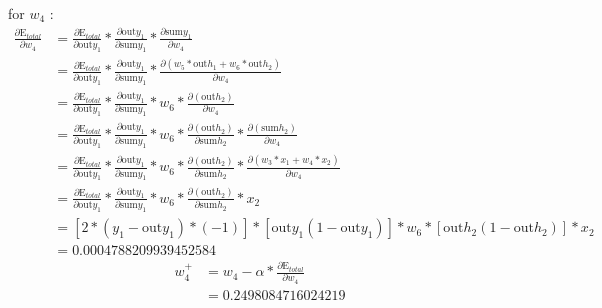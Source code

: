 \documentclass[a4paper, article, oneside, USenglish, IN5460]{memoir}
\begin{document}
{\newline
for $w_4$ :
\begin{equation}
\begin{aligned}
\frac{\partial \text{E}_{total}  }{\partial w_4} &= \frac{\partial \text{E}_{total}}{\partial \text{out}y_1} *\frac{\partial  \text{out}y_1}{\partial \text{sum}y_1}*\frac{\partial \text{sum}y_1}{\partial  w_4} \\
&= \frac{\partial \text{E}_{total}}{\partial \text{out}y_1} *\frac{\partial  \text{out}y_1}{\partial \text{sum}y_1}*\frac{\partial ( w_5*\text{out}h_1 + w_6*\text{out}h_2 )} {\partial w_4} \\
&= \frac{\partial \text{E}_{total}}{\partial \text{out}y_1} * \frac{\partial \text{out}y_1}{\partial \text{sum}y_1} *{w_6}* \frac{\partial ( \text{out}h_2 )} {\partial w_4}\\
&= \frac{\partial \text{E}_{total}}{\partial \text{out}y_1} * \frac{\partial \text{out}y_1}{\partial \text{sum}y_1} *{w_6}* \frac{\partial ( \text{out}h_2 )}{\partial \text{sum}h_2} * \frac{\partial ( \text{sum}h_2)}{\partial w_4}\\
&= \frac{\partial \text{E}_{total}}{\partial \text{out}y_1} * \frac{\partial \text{out}y_1}{\partial \text{sum}y_1} *{w_6}* \frac{\partial ( \text{out}h_2 )}{\partial \text{sum}h_2} * \frac{\partial ( w_3*x_1 + w_4*x_2)}{\partial w_4}\\
&= \frac{\partial \text{E}_{total}}{\partial \text{out}y_1} * \frac{\partial \text{out}y_1}{\partial \text{sum}y_1} *{w_6}* \frac{\partial ( \text{out}h_2 )}{\partial \text{sum}h_2} *  {x_2}\\
&= [2*(y_1 -\text{out}y_1)*(-1)] * [\text{out}y_1(1-\text{out}y_1)] *{w_6}* [\text{out}h_2 (1-\text{out}h_2)]*  {x_2}\\
& = 0.0004788209939452584

 \end{aligned}
\end{equation}
\begin{equation}
\begin{aligned}
w^+_4 &= w_4 - \alpha * \frac{\partial \text{E}_{total}  }{\partial w_4} \\
& = 0.2498084716024219
\end{aligned}
\end{equation}

}
\end{document}
